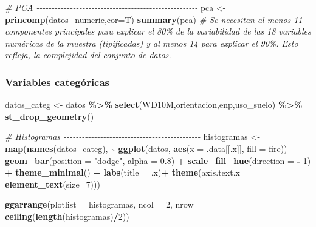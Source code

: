 \documentclass[12pt,a4paper,]{book}
\newenvironment{Shaded}{\begin{snugshade}}{\end{snugshade}}
\newcommand{\AttributeTok}[1]{\textcolor[rgb]{0.13,0.29,0.53}{#1}}
\newcommand{\CommentTok}[1]{\textcolor[rgb]{0.56,0.35,0.01}{\textit{#1}}}
\newcommand{\DecValTok}[1]{\textcolor[rgb]{0.00,0.00,0.81}{#1}}
\newcommand{\FloatTok}[1]{\textcolor[rgb]{0.00,0.00,0.81}{#1}}
\newcommand{\FunctionTok}[1]{\textcolor[rgb]{0.13,0.29,0.53}{\textbf{#1}}}
\newcommand{\NormalTok}[1]{#1}
\newcommand{\OtherTok}[1]{\textcolor[rgb]{0.56,0.35,0.01}{#1}}
\newcommand{\SpecialCharTok}[1]{\textcolor[rgb]{0.81,0.36,0.00}{\textbf{#1}}}
\newcommand{\StringTok}[1]{\textcolor[rgb]{0.31,0.60,0.02}{#1}}
\numberwithin{dummy}{section}
\theoremstyle{ocrenumbox}
\theoremstyle{blacknumex}
\theoremstyle{blacknumbox}
\theoremstyle{ocrenum}
\theoremstyle{ocrenum}
\begin{document}
\begin{Shaded}
\begin{Highlighting}[]
\CommentTok{\# PCA {-}{-}{-}{-}{-}{-}{-}{-}{-}{-}{-}{-}{-}{-}{-}{-}{-}{-}{-}{-}{-}{-}{-}{-}{-}{-}{-}{-}{-}{-}{-}{-}{-}{-}{-}{-}{-}{-}{-}{-}{-}{-}{-}{-}{-}{-}{-}{-}{-}{-}{-}{-}{-}}
\NormalTok{pca }\OtherTok{\textless{}{-}} \FunctionTok{princomp}\NormalTok{(datos\_numeric,}\AttributeTok{cor=}\NormalTok{T)}
\FunctionTok{summary}\NormalTok{(pca) }
\CommentTok{\# Se necesitan al menos 11 componentes principales para explicar el 80\% de la variabilidad de las 18 variables numéricas de la muestra (tipificadas) y al menos 14 para explicar el 90\%. Esto refleja, la complejidad del conjunto de datos.}
\end{Highlighting}
\end{Shaded}

\hypertarget{variables-categuxf3ricas-1}{%
\subsubsection*{Variables
categóricas}\label{variables-categuxf3ricas-1}}

\begin{Shaded}
\begin{Highlighting}[]
\NormalTok{datos\_categ }\OtherTok{\textless{}{-}}\NormalTok{ datos }\SpecialCharTok{\%\textgreater{}\%}  
  \FunctionTok{select}\NormalTok{(WD10M,orientacion,enp,uso\_suelo) }\SpecialCharTok{\%\textgreater{}\%} 
  \FunctionTok{st\_drop\_geometry}\NormalTok{()}

\CommentTok{\# Histogramas {-}{-}{-}{-}{-}{-}{-}{-}{-}{-}{-}{-}{-}{-}{-}{-}{-}{-}{-}{-}{-}{-}{-}{-}{-}{-}{-}{-}{-}{-}{-}{-}{-}{-}{-}{-}{-}{-}{-}{-}{-}{-}{-}{-}{-}}
\NormalTok{histogramas }\OtherTok{\textless{}{-}} \FunctionTok{map}\NormalTok{(}\FunctionTok{names}\NormalTok{(datos\_categ), }
                   \SpecialCharTok{\textasciitilde{}} \FunctionTok{ggplot}\NormalTok{(datos, }\FunctionTok{aes}\NormalTok{(}\AttributeTok{x =}\NormalTok{ .data[[.x]], }
                                       \AttributeTok{fill =}\NormalTok{ fire)) }\SpecialCharTok{+}
                    \FunctionTok{geom\_bar}\NormalTok{(}\AttributeTok{position =} \StringTok{"dodge"}\NormalTok{, }\AttributeTok{alpha =} \FloatTok{0.8}\NormalTok{) }\SpecialCharTok{+}
                    \FunctionTok{scale\_fill\_hue}\NormalTok{(}\AttributeTok{direction =} \SpecialCharTok{{-}} \DecValTok{1}\NormalTok{) }\SpecialCharTok{+}
                    \FunctionTok{theme\_minimal}\NormalTok{() }\SpecialCharTok{+}
                    \FunctionTok{labs}\NormalTok{(}\AttributeTok{title =}\NormalTok{ .x)}\SpecialCharTok{+}
                    \FunctionTok{theme}\NormalTok{(}\AttributeTok{axis.text.x =} \FunctionTok{element\_text}\NormalTok{(}\AttributeTok{size=}\DecValTok{7}\NormalTok{)))}

\FunctionTok{ggarrange}\NormalTok{(}\AttributeTok{plotlist =}\NormalTok{ histogramas, }\AttributeTok{ncol =} \DecValTok{2}\NormalTok{, }\AttributeTok{nrow =} \FunctionTok{ceiling}\NormalTok{(}\FunctionTok{length}\NormalTok{(histogramas)}\SpecialCharTok{/}\DecValTok{2}\NormalTok{))}
\end{Highlighting}
\end{Shaded}
\end{document}
